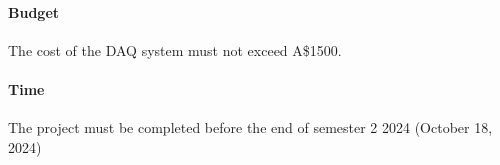 \documentclass[a4paper,11pt]{article}
\newcommand{\aud}{A\$}
\begin{document}
\paragraph{Budget} The cost of the DAQ system must not exceed \aud 1500.

\paragraph{Time} The project must be completed before the end of semester 2 2024 (October 18, 2024)

\end{document}
